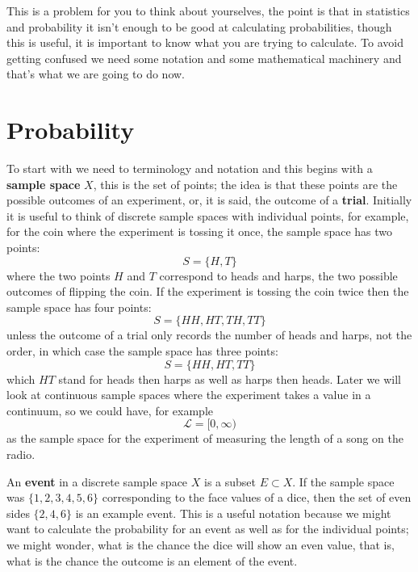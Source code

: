 \documentclass[11pt,a4paper]{scrartcl}
\begin{document}
This is a problem for you to think about yourselves, the point is that
in statistics and probability it isn't enough to be good at
calculating probabilities, though this is useful, it is important to
know what you are trying to calculate. To avoid getting confused we
need some notation and some mathematical machinery and that's what we
are going to do now.

\section*{Probability}

To start with we need to terminology and notation and this begins with
a \textbf{sample space} $X$, this is the set of points; the idea is
that these points are the possible outcomes of an experiment, or, it
is said, the outcome of a \textbf{trial}. Initially it is useful to
think of discrete sample spaces with individual points, for example,
for the coin where the experiment is tossing it once, the sample space
has two points:
\begin{equation}
S=\{H,T\}
\end{equation}
where the two points $H$ and $T$ correspond to heads and harps, the
two possible outcomes of flipping the coin. If the experiment is
tossing the coin twice then the sample space has four points:
\begin{equation}
S=\{HH,HT,TH,TT\}
\end{equation}
unless the outcome of a trial only records the number of heads and
harps, not the order, in which case the sample space has three points:
\begin{equation}
S=\{HH,HT,TT\}
\end{equation}
which $HT$ stand for heads then harps as well as harps then
heads. Later we will look at continuous sample spaces where the
experiment takes a value in a continuum, so we could have, for example
\begin{equation}
\mathcal{L}=[0,\infty)
\end{equation}
as the sample space for the experiment of measuring the length of a
song on the radio.

An \textbf{event} in a discrete sample space $X$ is a subset
$E\subset X$. If the sample space was $\{1,2,3,4,5,6\}$ corresponding to the
face values of a dice, then the set of even sides $\{2,4,6\}$ is an
example event. This is a useful notation because we might want to
calculate the probability for an event as well as for the individual
points; we might wonder, what is the chance the dice will show an even
value, that is, what is the chance the outcome is an element of the
event.
\end{document}
